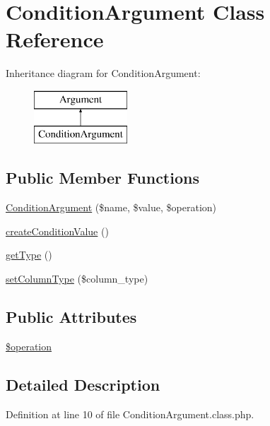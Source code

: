 \hypertarget{classConditionArgument}{}\section{Condition\+Argument Class Reference}
\label{classConditionArgument}
Inheritance diagram for Condition\+Argument\+:\begin{figure}[H]
\begin{center}
\leavevmode
\includegraphics[height=2.000000cm]{classConditionArgument}
\end{center}
\end{figure}
\subsection*{Public Member Functions}
\begin{DoxyCompactItemize}
\item 
\hyperlink{classConditionArgument_a9adc8c95c5f227954e7b6c46e89a5b65}{Condition\+Argument} (\$name, \$value, \$operation)
\item 
\hyperlink{classConditionArgument_a2f1c182c8765ebc62d2d50f575954982}{create\+Condition\+Value} ()
\item 
\hyperlink{classConditionArgument_a39922137cc67e751a5577850bce3cac7}{get\+Type} ()
\item 
\hyperlink{classConditionArgument_a7ee8444a1bfa4763458a006e0fd6ef1e}{set\+Column\+Type} (\$column\+\_\+type)
\end{DoxyCompactItemize}
\subsection*{Public Attributes}
\begin{DoxyCompactItemize}
\item 
\hyperlink{classConditionArgument_acfccaada47560781bfbdf51086ce3869}{\$operation}
\end{DoxyCompactItemize}


\subsection{Detailed Description}


Definition at line 10 of file Condition\+Argument.\+class.\+php.



